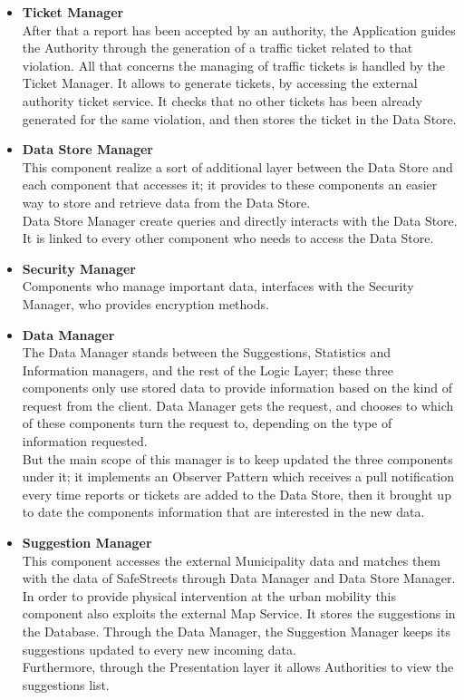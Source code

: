 \begin{itemize}
     
     \item\textbf{Ticket Manager}\\
     After that a report has been accepted by an authority, the Application guides the Authority through the generation of a traffic ticket related to that violation. All that concerns the managing of traffic tickets is handled by the Ticket Manager. It allows to generate tickets, by accessing the external authority ticket service. It checks that no other tickets has been already generated for the same violation, and then stores the ticket in the Data Store.
     
     \item\textbf{Data Store Manager}\\
     This component realize a sort of additional layer between the Data Store and each component that accesses it; it provides to these components an easier way to store and retrieve data from the Data Store. \\
     Data Store Manager create queries and directly interacts with the Data Store. \\
     It is linked to every other component who needs to access the Data Store.
     
     \item\textbf{Security Manager}\\
     Components who manage important data, interfaces with the Security Manager, who provides encryption methods.
     
     \item\textbf{Data Manager}\\
     The Data Manager stands between the Suggestions, Statistics and Information managers, and the rest of the Logic Layer; these three components only use stored data to provide information based on the kind of request from the client. Data Manager gets the request, and chooses to which of these components turn the request to, depending on the type of information requested. \\
     But the main scope of this manager is to keep updated the three components under it; it implements an Observer Pattern which receives a pull notification every time reports or tickets are added to the Data Store, then it brought up to date the components information that are interested in the new data. 
     
     \item\textbf{Suggestion Manager}\\
     This component accesses the external Municipality data and matches them with the data of SafeStreets through Data Manager and Data Store Manager. In order to provide physical intervention at the urban mobility this component also exploits the external Map Service.
     It stores the suggestions in the Database. Through the Data Manager, the Suggestion Manager keeps its suggestions updated to every new incoming data.\\
     Furthermore, through the Presentation layer it allows Authorities to view the suggestions list.
     

\end{itemize}

